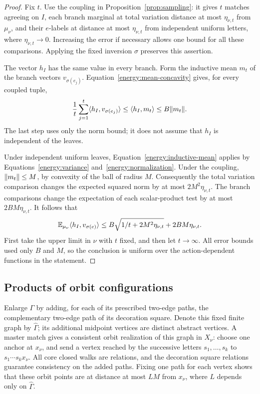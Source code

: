 \begin{proof}
Fix $t$.  Use the coupling in Proposition~\ref{prop:sampling}: it
gives $t$ matches agreeing on $I$, each branch marginal at total
variation distance at most $\eta_{\nu,t}$ from $\mu_\nu$, and their
$e$-labels at distance at most $\eta_{\nu,t}$ from independent uniform
letters, where $\eta_{\nu,t}\to0$.  Increasing the error if necessary
allows one bound for all these comparisons.  Applying the fixed
inversion $\sigma$ preserves this assertion.

The vector $h_I$ has the same value in every branch.  Form the
inductive mean $m_t$ of the branch vectors $v_{\sigma(e_j)}$.
Equation~\eqref{energy:mean-concavity} gives, for every coupled tuple,
\[
 \frac1t\sum_{j=1}^t\langle h_I,v_{\sigma(e_j)}\rangle
 \le\langle h_I,m_t\rangle\le B\lVert m_t\rVert.
\]
The last step uses only the norm bound; it does not assume that $h_I$
is independent of the leaves.

Under independent uniform leaves,
Equation~\eqref{energy:inductive-mean} applies by
Equations~\eqref{energy:variance} and~\eqref{energy:normalization}.
Under the coupling, $\lVert m_t\rVert\le M$, by convexity of the ball of
radius $M$.  Consequently the total variation comparison changes the
expected squared norm by at most $2M^2\eta_{\nu,t}$.  The branch
comparisons change the expectation of each scalar-product test by at
most $2BM\eta_{\nu,t}$.  It follows that
\[
 \mathbb E_{\mu_\nu}\langle h_I,v_{\sigma(e)}\rangle
 \le B\sqrt{1/t+2M^2\eta_{\nu,t}}+2BM\eta_{\nu,t}.
\]
First take the upper limit in $\nu$ with $t$ fixed, and then let
$t\to\infty$.  All error bounds used only $B$ and $M$, so the
conclusion is uniform over the action-dependent functions in the
statement.
\end{proof}

\subsection{Products of orbit configurations}

Enlarge $\Gamma$ by adding, for each of its prescribed two-edge paths,
the complementary two-edge path of its decoration square.  Denote
this fixed finite graph by $\widehat\Gamma$; its additional midpoint
vertices are distinct abstract vertices.  A master match gives a
consistent orbit realization of this graph in $X_\nu$: choose one
anchor at $x_\nu$, and send a vertex reached by the successive letters
$s_1,\ldots,s_k$ to $s_1\cdots s_kx_\nu$.  All core closed walks are
relations, and the decoration square relations guarantee consistency
on the added paths.  Fixing one path for each vertex shows that these
orbit points are at distance at most $LM$ from $x_\nu$, where $L$
depends only on $\widehat\Gamma$.

